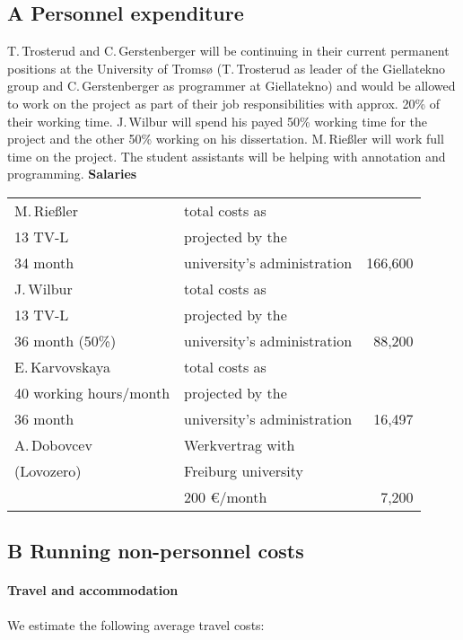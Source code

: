 \documentclass[a4paper,12pt]{article}
\begin{document}
{{{{\subsection*{A Personnel expenditure}
T.\,Trosterud and C.\,Gersten\-berger will be continuing in their current permanent positions at the University of Tromsø (T.\,Trosterud as leader of the Giellatekno group and C.\,Gerstenberger as programmer at Giellatekno) and would be allowed to work on the project as part of their job responsibilities with approx. 20\% of their working time.%
 J.\,Wilbur will spend his payed 50\% working time for the project and the other 50\% working on his dissertation. M.\,Rießler will work full time on the project. The student assistants will be helping with annotation and programming.%
\noindent \textbf{Salaries}\\
\begin{longtable}{| l | l | r |}
\hline
M.\,Rießler&total costs as&\\
13 TV-L&projected by the&\\
34 month&university's administration&166,600\\%
\hline
J.\,Wilbur&total costs as&\\
13 TV-L&projected by the&\\
36 month (50\%)&university's administration&88,200\\
\hline
E.\,Karvovskaya&total costs as&\\
40 working hours/month& projected by the&\\
36 month&university's administration&16,497\\
\hline
A.\,Dobovcev	&Werkvertrag with	&\\
(Lovozero)	&Freiburg university	&\\
			&200 €/month		&7,200\\
\hline
\end{longtable}

\subsection*{B Running non-personnel costs}
\paragraph{Travel and accommodation}
We estimate the following average travel costs:\\

}}}}
\end{document}
